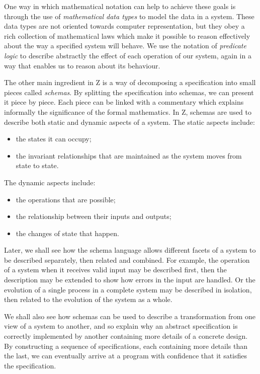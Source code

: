One way in which mathematical notation can help to achieve these
goals is through the use of {\em mathematical data types\/}
to model the data in a system. These data types
are not oriented towards computer representation, but they
obey a rich collection of mathematical laws which make it possible
to reason effectively about the way a specified system will
behave. We use the notation of {\em predicate logic\/} to
describe abstractly the effect of each operation of our
system, again in a way that enables us to reason about its
behaviour.

The other main ingredient in Z is a way of decomposing
a specification into small pieces called {\em schemas}. By
splitting the specification into schemas, we can present
it piece by piece. Each piece can be linked with a
commentary which explains informally the significance of the
formal mathematics.
In Z, schemas are used to describe both
static and dynamic aspects of a system. The static aspects
include:
\begin{itemize}
\item	the states it can occupy;
\item	the invariant relationships that are maintained
	as the system moves from state to state.
\end{itemize}
The dynamic aspects include:
\begin{itemize}
\item	the operations that are possible;
\item	the relationship between their inputs and outputs;
\item	the changes of state that happen.
\end{itemize}
Later, we shall see how the schema language allows different
facets of a system to be described separately, then related
and combined. For example, the operation of a system when it
receives valid input may be described first, then the
description may be extended to show how errors in the input
are handled. Or the evolution of a single process in a
complete system may be described in isolation, then related
to the evolution of the system as a whole.

We shall also see how schemas can be used to describe a
transformation from one view of a system to another, and so
explain why an abstract specification is correctly
implemented by another containing more details of a concrete
design. By constructing a sequence of specifications, each
containing more details than the last, we can eventually
arrive at a program with confidence that it satisfies the
specification.

